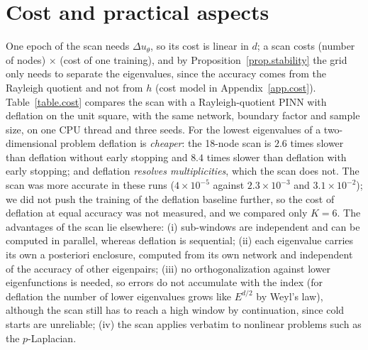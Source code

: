 \documentclass[10pt]{amsart}
\theoremstyle{definition}
\theoremstyle{remark}
\theoremstyle{plain}
\begin{document}
\section{Cost and practical aspects}\label{sec.cost}

One epoch of the scan needs $\Delta u_\theta$, so its cost is linear in $d$; a scan costs (number of
nodes) $\times$ (cost of one training), and by Proposition~\ref{prop.stability} the grid only needs to
separate the eigenvalues, since the accuracy comes from the Rayleigh quotient and not from $h$ (cost
model in Appendix~\ref{app.cost}). Table~\ref{table.cost} compares the scan with a Rayleigh-quotient PINN
with deflation \cite{Rowan-Evans-Maute-Dootsan,Holliday-Lindner-Ditto,E-Yu} on the unit square, with the
same network, boundary factor and sample size, on one CPU thread and three seeds. For the lowest
eigenvalues of a two-dimensional problem deflation is \emph{cheaper}: the 18-node scan is $2.6$ times
slower than deflation without early stopping and $8.4$ times slower than deflation with early stopping;
and deflation \emph{resolves multiplicities}, which the scan does not. The scan was more accurate in
these runs ($4\times10^{-5}$ against $2.3\times10^{-3}$ and $3.1\times10^{-2}$); we did not push the
training of the deflation baseline further, so the cost of deflation at equal accuracy was not
measured, and we compared only $K=6$. The advantages of the scan lie elsewhere: (i) sub-windows are
independent and can be computed in parallel, whereas deflation is sequential; (ii) each eigenvalue
carries its own a posteriori enclosure, computed from its own network and independent of the accuracy of
other eigenpairs; (iii) no orthogonalization against lower eigenfunctions is needed, so errors do not
accumulate with the index (for deflation the number of lower eigenvalues grows like $E^{d/2}$ by Weyl's
law), although the scan still has to reach a high window by continuation, since cold starts are
unreliable; (iv) the scan applies verbatim to nonlinear problems such as the $p$-Laplacian.
\end{document}
